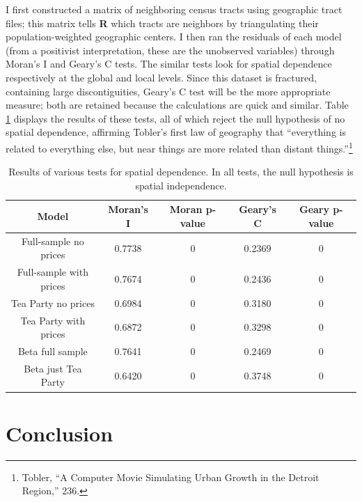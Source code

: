 \documentclass[12pt,oneside]{psthesis}
\begin{document}
I first constructed a matrix of neighboring census tracts using geographic tract files; this matrix tells \textbf{R} which tracts are neighbors by triangulating their population-weighted geographic centers.
I then ran the residuals of each model (from a positivist interpretation, these are the unobserved variables) through Moran's I and Geary's C tests.
The similar tests look for spatial dependence respectively at the global and local levels.
Since this dataset is fractured, containing large discontiguities, Geary's C test will be the more appropriate measure; both are retained because the calculations are quick and similar.
Table \ref{tab:spdep} displays the results of these tests, all of which reject the null hypothesis of no spatial dependence, affirming Tobler's first law of geography that ``everything is related to everything else, but near things are more related than distant things.''\footnote{Tobler, ``A Computer Movie Simulating Urban Growth in the Detroit Region,'' 236.}
\begin{table}

\caption{\label{tab:spdep}Results of various tests for spatial dependence. In all tests, the null hypothesis is spatial independence.}
\centering
\begin{tabular}[t]{ccccc}
\toprule
Model & Moran's I & Moran p-value & Geary's C & Geary p-value\\
\midrule
Full-sample no prices & 0.7738 & 0 & 0.2369 & 0\\
Full-sample with prices & 0.7674 & 0 & 0.2436 & 0\\
Tea Party no prices & 0.6984 & 0 & 0.3180 & 0\\
Tea Party with prices & 0.6872 & 0 & 0.3298 & 0\\
Beta full sample & 0.7641 & 0 & 0.2469 & 0\\
\addlinespace
Beta just Tea Party & 0.6420 & 0 & 0.3748 & 0\\
\bottomrule
\end{tabular}
\end{table}
\hypertarget{conclusion-1}{%
\section{Conclusion}\label{conclusion-1}}
\end{document}
